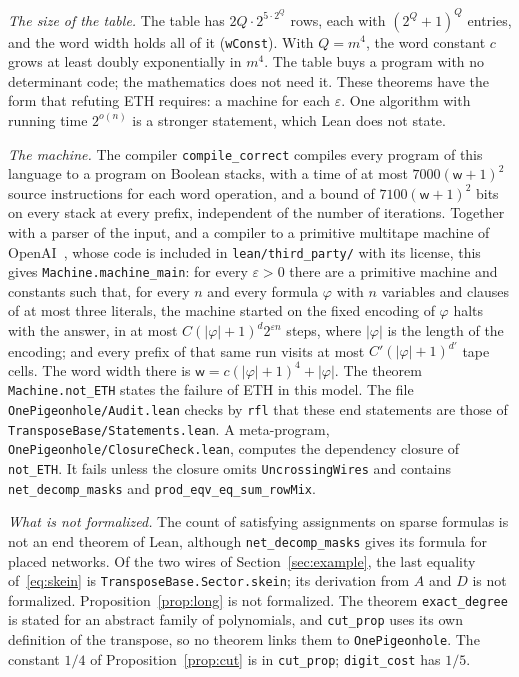 \documentclass[11pt]{article}
\numberwithin{equation}{section}
\theoremstyle{remark}
\newcommand{\lean}[1]{\texttt{#1}}
\begin{document}
\medskip\noindent\emph{The size of the table.} The table has $2Q\cdot2^{5\cdot2^Q}$ rows, each with $(2^Q+1)^Q$ entries, and the word width holds all of it (\lean{wConst}). With $Q=m^4$, the word constant $c$ grows at least doubly exponentially in $m^4$. The table buys a program with no determinant code; the mathematics does not need it. These theorems have the form that refuting ETH requires: a machine for each $\varepsilon$. One algorithm with running time $2^{o(n)}$ is a stronger statement, which Lean does not state.

\medskip\noindent\emph{The machine.} The compiler \lean{compile\_correct} compiles every program of this language to a program on Boolean stacks, with a time of at most $7000(\mathsf w+1)^2$ source instructions for each word operation, and a bound of $7100(\mathsf w+1)^2$ bits on every stack at every prefix, independent of the number of iterations. Together with a parser of the input, and a compiler to a primitive multitape machine of OpenAI~\cite{OAIlean}, whose code is included in \texttt{lean/third\_party/} with its license, this gives \lean{Machine.machine\_main}: for every $\varepsilon>0$ there are a primitive machine and constants such that, for every $n$ and every formula $\varphi$ with $n$ variables and clauses of at most three literals, the machine started on the fixed encoding of $\varphi$ halts with the answer, in at most $C(|\varphi|+1)^d2^{\varepsilon n}$ steps, where $|\varphi|$ is the length of the encoding; and every prefix of that same run visits at most $C'(|\varphi|+1)^{d'}$ tape cells. The word width there is $\mathsf w=c(|\varphi|+1)^4+|\varphi|$. The theorem \lean{Machine.not\_ETH} states the failure of ETH in this model. The file \lean{OnePigeonhole/Audit.lean} checks by \lean{rfl} that these end statements are those of \lean{TransposeBase/Statements.lean}. A meta-program, \lean{OnePigeonhole/ClosureCheck.lean}, computes the dependency closure of \lean{not\_ETH}. It fails unless the closure omits \lean{UncrossingWires} and contains \lean{net\_decomp\_masks} and \lean{prod\_eqv\_eq\_sum\_rowMix}.

\medskip\noindent\emph{What is not formalized.} The count of satisfying assignments on sparse formulas is not an end theorem of Lean, although \lean{net\_decomp\_masks} gives its formula for placed networks. Of the two wires of Section~\ref{sec:example}, the last equality of~\eqref{eq:skein} is \lean{TransposeBase.Sector.skein}; its derivation from $A$ and $D$ is not formalized. Proposition~\ref{prop:long} is not formalized. The theorem \lean{exact\_degree} is stated for an abstract family of polynomials, and \lean{cut\_prop} uses its own definition of the transpose, so no theorem links them to \lean{OnePigeonhole}. The constant $1/4$ of Proposition~\ref{prop:cut} is in \lean{cut\_prop}; \lean{digit\_cost} has $1/5$.
\end{document}
